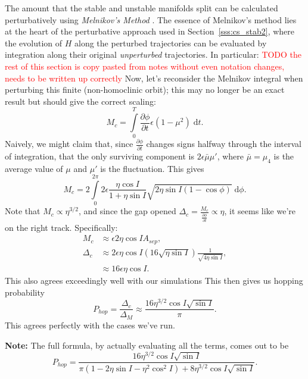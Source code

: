 \documentclass[
        fleqn,
        usenatbib,
    ]{mnras}
\newcommand*{\pd}[2]{\frac{\partial#1}{\partial#2}}
\newcommand*{\p}[1]{\left(#1\right)}
\begin{document}
The amount that the stable and unstable manifolds split can be calculated
perturbatively using \emph{Melnikov's Method} \citep{g_and_h}. The essence of
Melnikov's method lies at the heart of the perturbative approach used in
Section~\ref{sss:cs_stab2}, where the evolution of $H$ along the perturbed
trajectories can be evaluated by integration along their original
\emph{unperturbed} trajectories. In particular: \textcolor{red}{TODO the rest of
this section is copy pasted from notes without even notation changes, needs to
be written up correctly} Now, let's reconsider the Melnikov integral when
perturbing this finite (non-homoclinic orbit); this may no longer be an exact
result but should give the correct scaling:
\begin{equation}
    M_c = \int\limits_0^T \pd{\phi}{t}\epsilon \p{1 - \mu^2}\;\mathrm{d}t.
\end{equation}
Naively, we might claim that, since $\pd{\phi}{t}$ changes signs halfway through
the interval of integration, that the only surviving component is $2\epsilon
\bar{\mu}\mu'$, where $\bar{\mu} = \mu_4$ is the average value of $\mu$ and
$\mu'$ is the fluctuation. This gives
\begin{equation}
    M_c = 2\int\limits_0^{2\pi}2\epsilon \frac{\eta \cos I}{1 + \eta \sin I}
        \sqrt{2\eta \sin I \p{1 - \cos \phi}}\;\mathrm{d}\phi.
\end{equation}
Note that $M_c \propto \eta^{3/2}$, and since the gap opened $\Delta_c =
\frac{M_c}{\pd{\phi}{t}} \propto \eta$, it seems like we're on the right track.
Specifically:
\begin{align}
    M_c &\approx \epsilon 2\eta \cos I A_{sep},\\
    \Delta_c &\approx 2\epsilon \eta \cos I \p{16 \sqrt{\eta \sin I}}
        \frac{1}{\sqrt{4\eta \sin I}},\\
        &\approx 16\epsilon \eta \cos I.
\end{align}
This also agrees exceedingly well with our simulations This then gives us
hopping probability
\begin{equation}
    P_{hop} = \frac{\Delta_c}{\Delta_M} \approx
        \frac{16\eta^{3/2}\cos I \sqrt{\sin I}}{\pi}.
\end{equation}
This agrees perfectly with the cases we've run.

\textbf{Note:} The full formula, by actually evaluating all the terms, comes out
to be
\begin{equation}
    P_{hop} = \frac{16\eta^{3/2}\cos I \sqrt{\sin I}}{\pi
        \p{1 - 2\eta \sin I - \eta^2 \cos^2 I}
        + 8\eta^{3/2}\cos I \sqrt{\sin I}}.
\end{equation}
\end{document}

